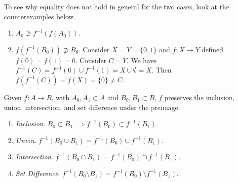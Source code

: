 \documentclass{article}
\begin{document}
    \begin{example}
      To see why equality does not hold in general for the two cases, look at the counterexamples below. 
      \begin{enumerate}
        \item $A_0 \not\supset f^{-1} (f(A_0))$. 
        \item $f(f^{-1}(B_0)) \not\supset B_0$. Consider $X = Y = \{0, 1\}$ and $f: X \rightarrow Y$ defined $f(0) = f(1) = 0$. Consider $C = Y$. We have $f^{-1} (C) = f^{-1} (0) \cup f^{-1} (1) = X \cup \emptyset = X$. Then $f(f^{-1} (C)) = f(X) = \{0\} \neq C$. 
      \end{enumerate}
    \end{example}

    \begin{theorem}
      Given $f: A \rightarrow B$, with $A_0, A_1 \subset A$ and $B_0, B_1 \subset B$, $f$ preserves the inclusion, union, intersection, and set difference under the preimage. 
      \begin{enumerate}
        \item \textit{Inclusion}. $B_0 \subset B_1 \implies f^{-1} (B_0) \subset f^{-1} (B_1)$. 
        \item \textit{Union}. $f^{-1} (B_0 \cup B_1) = f^{-1} (B_0) \cup f^{-1} (B_1)$. 
        \item \textit{Intersection}. $f^{-1} (B_0 \cap B_1) = f^{-1} (B_0) \cap f^{-1} (B_1)$. 
        \item \textit{Set Difference}. $f^{-1}(B_0 \setminus B_1) = f^{-1} (B_0) \setminus f^{-1} (B_1)$. 
      \end{enumerate}
    \end{theorem} 
\end{document}
